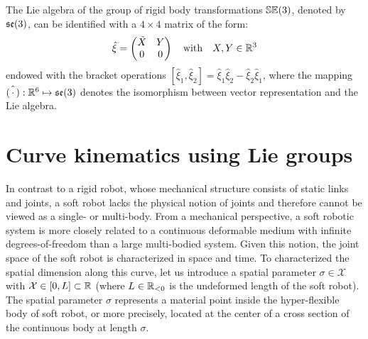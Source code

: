 \begin{definition}
The Lie algebra of the group of rigid body transformations ${\mathbb{SE}(3)}$, denoted by ${\mathfrak{se}(3)}$, can be identified with a $4 \times 4$ matrix of the form:
\begin{equation}
\hat{{\xi}} = 
\begin{pmatrix} \tilde{{X}} & {Y} \\ 0 & 0 \end{pmatrix} \quad \text{with} \quad X,Y \in \mathbb{R}^3
\end{equation}
endowed with the bracket operations $[\hat{\xi}_1,\hat{\xi}_2] = \hat{\xi}_1\hat{\xi}_2 - \hat{\xi}_2 \hat{\xi}_1$, where the mapping $\hat{(\,\cdot\,)}: \mathbb{R}^6 \mapsto {\mathfrak{se}(3)}$ denotes the isomorphism between vector representation and the Lie algebra.

\end{definition}

\section{Curve kinematics using Lie groups}
In contrast to a rigid robot, whose mechanical structure consists of static links and joints, a soft robot lacks the physical notion of joints and therefore cannot be viewed as a single- or multi-body. From a mechanical perspective, a soft robotic system is more closely related to a continuous deformable medium with infinite degrees-of-freedom than a large multi-bodied system. Given this notion, the joint space of the soft robot is characterized in space and time. To characterized the spatial dimension along this curve, let us introduce a spatial parameter $\sigma \in \mathcal{X}$ with $\mathcal{X} \in [0,L] \subset \mathbb{R}$ (where $L \in \operatorname{\mathbb{R}_{<0}}$ is the undeformed length of the soft robot). The spatial parameter $\sigma$ represents a material point inside the hyper-flexible body of soft robot, or more precisely, located at the center of a cross section of the continuous body at length $\sigma$. 

